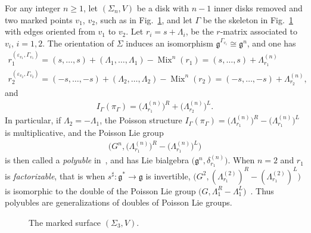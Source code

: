 \documentclass[10pt,a4paper]{amsart}
\numberwithin{equation}{section}
\def \g {\mathfrak{a}}
\def \g {\mathfrak{g}}
\DeclareMathOperator{\Mix}{Mix}
\def \sGam {{\scriptscriptstyle \Gamma}}
\newcommand{\ra}{\rangle}
\begin{document}
\begin{Example}
For any integer $n \geq 1$, let $(\Sigma_n, V)$ be a disk with $n-1$ inner disks removed and two marked points $v_1$, $v_2$, such as in Fig.~\ref{sigma_3:fig}, and let $\Gamma$ be the skeleton in Fig.~\ref{sigma_3:fig} with edges oriented from $v_1$ to $v_2$. Let $r_i = s + \Lambda_i$, be the $r$-matrix associated to $v_i$, $i=1,2$. The orientation of $\Sigma$ induces an isomorphism $\g^{\sGam_{v_i}} \cong \g^n$, and one has
\begin{gather*}
r_1^{(\varepsilon_{v_1}, \sGam_{v_1})} = (s, \ldots, s) + (\Lambda_1, \ldots, \Lambda_1) - \Mix^n(r_1) = (s, \ldots, s) + \Lambda_{r_1}^{(n)} \\
r_2^{(\varepsilon_{v_2}, \sGam_{v_2})} = (-s, \ldots, -s) + (\Lambda_2, \ldots, \Lambda_2) - \Mix^n(r_2) = (-s, \ldots, -s) + \Lambda_{r_2}^{(n)},
\end{gather*}
and
\begin{gather*}
I_{\Gamma}(\pi_{\sGam}) = \big(\Lambda_{r_1}^{(n)}\big)^R + \big(\Lambda_{r_2}^{(n)}\big)^L.
\end{gather*}
In particular, if $\Lambda_2 = -\Lambda_1$, the Poisson structure $I_{\Gamma}(\pi_{\sGam}) = \big(\Lambda_{r_1}^{(n)}\big)^R - \big(\Lambda_{r_1}^{(n)}\big)^L$ is multiplicative, and the Poisson Lie group
\begin{gather*}
\big(G^n, \big(\Lambda_{r_1}^{(n)}\big)^R - \big(\Lambda_{r_1}^{(n)}\big)^L\big)
\end{gather*}
is then called a {\it polyuble} in~\cite{FR2}, and has Lie bialgebra $\big(\g^n, \delta_{r_1}^{(n)}\big)$. When $n = 2$ and $r_1$ is {\it factorizable}, that is when $s^\sharp\colon \g^* \to \g$ is invertible, $\big(G^2, (\Lambda_{r_1}^{(2)})^R - (\Lambda_{r_1}^{(2)})^L\big)$ is isomorphic to the double of the Poisson Lie group $\big(G, \Lambda_1^R - \Lambda_1^L\big)$~\cite{Lu-Mou:mixed}. Thus polyubles are generalizations of doubles of Poisson Lie groups.

\begin{figure}\centering
{}
\caption{The marked surface $(\Sigma_3, V)$.} \label{sigma_3:fig}
\end{figure}
\end{Example}
\end{document}
